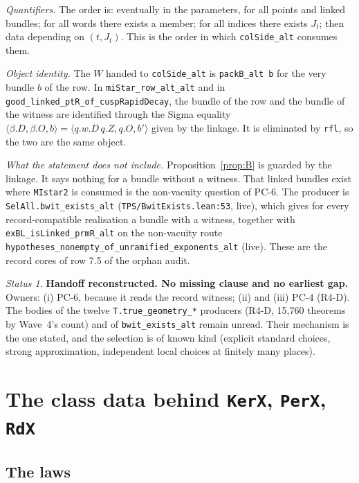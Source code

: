 \documentclass[11pt]{article}
\newcommand{\lean}[1]{\nolinkurl{#1}}
\newcommand{\Lpath}[1]{\nolinkurl{#1}}
\newcommand{\PC}[1]{PC-#1}
\theoremstyle{remark}
\newtheorem*{status}{Status}
\begin{document}
\emph{Quantifiers.} The order is: eventually in the parameters, for all points and linked bundles; for all words there exists a member; for all indices there exists $J_t$; then data depending on $(t,J_t)$. This is the order in which \lean{colSide_alt} consumes them.

\emph{Object identity.} The $W$ handed to \lean{colSide_alt} is \lean{packB_alt}~\lean{b} for the very bundle $b$ of the row. In \lean{miStar_row_alt_alt} and in \lean{good_linked_ptR_of_cuspRapidDecay}, the bundle of the row and the bundle of the witness are identified through the Sigma equality $\langle\beta.D,\beta.O,b\rangle=\langle q.w.D\,q.Z,q.O,b'\rangle$ given by the linkage. It is eliminated by \lean{rfl}, so the two are the same object.

\emph{What the statement does not include.} Proposition~\ref{prop:B} is guarded by the linkage. It says nothing for a bundle without a witness. That linked bundles exist where \lean{MIstar2} is consumed is the non-vacuity question of \PC{6}. The producer is \lean{SelAll.bwit_exists_alt} (\Lpath{TPS/BwitExists.lean:53}, live), which gives for every record-compatible realisation a bundle with a witness, together with \lean{exBL_isLinked_prmR_alt} on the non-vacuity route \lean{hypotheses_nonempty_of_unramified_exponents_alt} (live). These are the record cores of row 7.5 of the orphan audit.

\begin{status}
\textbf{Handoff reconstructed. No missing clause and no earliest gap.} Owners: (i) \PC{6}, because it reads the record witness; (ii) and (iii) \PC{4} (R4-D). The bodies of the twelve \lean{T.true_geometry_*} producers (R4-D, 15{,}760 theorems by Wave~4's count) and of \lean{bwit_exists_alt} remain unread. Their mechanism is the one stated, and the selection is of known kind (explicit standard choices, strong approximation, independent local choices at finitely many places).
\end{status}

\section{The class data behind \texorpdfstring{\lean{KerX}, \lean{PerX}, \lean{RdX}}{KerX, PerX, RdX}}\label{sec:C}

\subsection{The laws}
\end{document}
